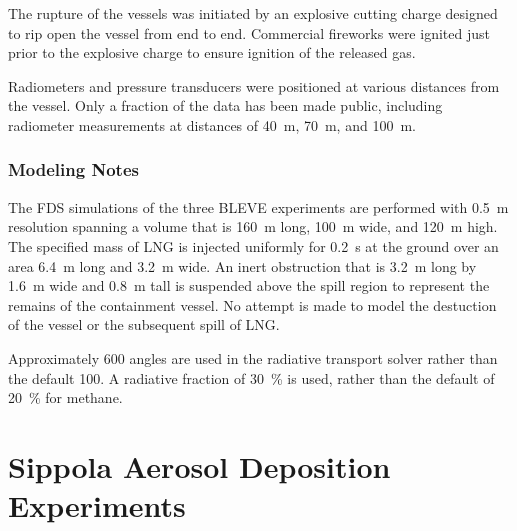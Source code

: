 The rupture of the vessels was initiated by an explosive cutting charge designed to rip open the vessel from end to end. Commercial fireworks were ignited just prior to the explosive charge to ensure ignition of the released gas.

Radiometers and pressure transducers were positioned at various distances from the vessel. Only a fraction of the data has been made public, including radiometer measurements at distances of 40~m, 70~m, and 100~m.

\subsubsection{Modeling Notes}

The FDS simulations of the three BLEVE experiments are performed with 0.5~m resolution spanning a volume that is 160~m long, 100~m wide, and 120~m high. The specified mass of LNG is injected uniformly for 0.2~s at the ground over an area 6.4~m long and 3.2~m wide. An inert obstruction that is 3.2~m long by 1.6~m wide and 0.8~m tall is suspended above the spill region to represent the remains of the containment vessel. No attempt is made to model the destuction of the vessel or the subsequent spill of LNG. 

Approximately 600 angles are used in the radiative transport solver rather than the default 100. A radiative fraction of 30~\% is used, rather than the default of 20~\% for methane.





\section{Sippola Aerosol Deposition Experiments}
\label{Sippola_Aerosol_Deposition_Description}

